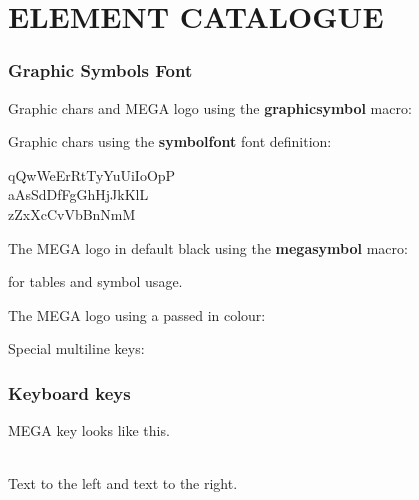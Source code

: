 %
%
%


\part{ELEMENT CATALOGUE}

\section{Graphic Symbols Font}

Graphic chars and MEGA logo using the {\bf graphicsymbol} macro:


Graphic chars using the {\bf symbolfont} font definition:

\begin{symbolfont}%
	qQwWeErRtTyYuUiIoOpP\\
	aAsSdDfFgGhHjJkKlL\\
	zZxXcCvVbBnNmM%
\end{symbolfont}%

The MEGA logo in default black using the {\bf megasymbol} macro:

\megasymbol for tables and symbol usage.

The MEGA logo using a passed in colour:

\megasymbol[black]
\megasymbol[brown]
\megasymbol[orange]
\megasymbol[blue]

Special multiline keys:
%
%
%
%
%
%
%

\section{Keyboard keys}

\megasymbolkey MEGA key looks like this. \\

\\

Text to the left  and text to the right.

    \megakey{ } 

